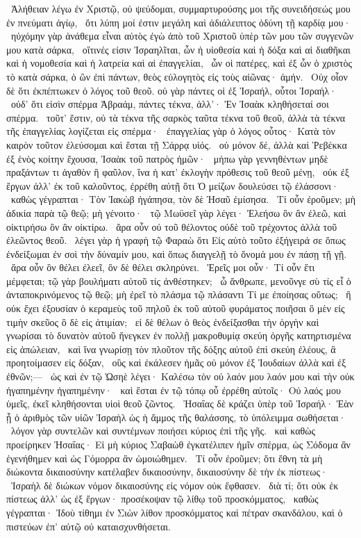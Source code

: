 ~Ἀλήθειαν λέγω ἐν Χριστῷ, οὐ ψεύδομαι, συμμαρτυρούσης μοι τῆς συνειδήσεώς μου ἐν πνεύματι ἁγίῳ,
~ὅτι λύπη μοί ἐστιν μεγάλη καὶ ἀδιάλειπτος ὀδύνη τῇ καρδίᾳ μου·
~ηὐχόμην γὰρ ἀνάθεμα εἶναι αὐτὸς ἐγὼ ἀπὸ τοῦ Χριστοῦ ὑπὲρ τῶν  μου τῶν συγγενῶν μου κατὰ σάρκα,
~οἵτινές εἰσιν Ἰσραηλῖται, ὧν ἡ υἱοθεσία καὶ ἡ δόξα καὶ αἱ διαθῆκαι καὶ ἡ νομοθεσία καὶ ἡ λατρεία καὶ αἱ ἐπαγγελίαι,
~ὧν οἱ πατέρες, καὶ ἐξ ὧν ὁ χριστὸς τὸ κατὰ σάρκα, ὁ ὢν ἐπὶ πάντων, θεὸς εὐλογητὸς εἰς τοὺς αἰῶνας· ἀμήν.
~Οὐχ οἷον δὲ ὅτι ἐκπέπτωκεν ὁ λόγος τοῦ θεοῦ. οὐ γὰρ πάντες οἱ ἐξ Ἰσραήλ, οὗτοι Ἰσραήλ·
~οὐδ’ ὅτι εἰσὶν σπέρμα Ἀβραάμ, πάντες τέκνα, ἀλλ’· Ἐν Ἰσαὰκ κληθήσεταί σοι σπέρμα.
~τοῦτ’ ἔστιν, οὐ τὰ τέκνα τῆς σαρκὸς ταῦτα τέκνα τοῦ θεοῦ, ἀλλὰ τὰ τέκνα τῆς ἐπαγγελίας λογίζεται εἰς σπέρμα·
~ἐπαγγελίας γὰρ ὁ λόγος οὗτος· Κατὰ τὸν καιρὸν τοῦτον ἐλεύσομαι καὶ ἔσται τῇ Σάρρᾳ υἱός.
~οὐ μόνον δέ, ἀλλὰ καὶ Ῥεβέκκα ἐξ ἑνὸς κοίτην ἔχουσα, Ἰσαὰκ τοῦ πατρὸς ἡμῶν·
~μήπω γὰρ γεννηθέντων μηδὲ πραξάντων τι ἀγαθὸν ἢ φαῦλον, ἵνα ἡ κατ’ ἐκλογὴν πρόθεσις τοῦ θεοῦ μένῃ,
~οὐκ ἐξ ἔργων ἀλλ’ ἐκ τοῦ καλοῦντος, ἐρρέθη αὐτῇ ὅτι Ὁ μείζων δουλεύσει τῷ ἐλάσσονι·
~καθὼς γέγραπται· Τὸν Ἰακὼβ ἠγάπησα, τὸν δὲ Ἠσαῦ ἐμίσησα.
~Τί οὖν ἐροῦμεν; μὴ ἀδικία παρὰ τῷ θεῷ; μὴ γένοιτο·
~τῷ Μωϋσεῖ γὰρ λέγει· Ἐλεήσω ὃν ἂν ἐλεῶ, καὶ οἰκτιρήσω ὃν ἂν οἰκτίρω.
~ἄρα οὖν οὐ τοῦ θέλοντος οὐδὲ τοῦ τρέχοντος ἀλλὰ τοῦ ἐλεῶντος θεοῦ.
~λέγει γὰρ ἡ γραφὴ τῷ Φαραὼ ὅτι Εἰς αὐτὸ τοῦτο ἐξήγειρά σε ὅπως ἐνδείξωμαι ἐν σοὶ τὴν δύναμίν μου, καὶ ὅπως διαγγελῇ τὸ ὄνομά μου ἐν πάσῃ τῇ γῇ.
~ἄρα οὖν ὃν θέλει ἐλεεῖ, ὃν δὲ θέλει σκληρύνει.
~Ἐρεῖς μοι οὖν· Τί οὖν ἔτι μέμφεται; τῷ γὰρ βουλήματι αὐτοῦ τίς ἀνθέστηκεν;
~ὦ ἄνθρωπε, μενοῦνγε σὺ τίς εἶ ὁ ἀνταποκρινόμενος τῷ θεῷ; μὴ ἐρεῖ τὸ πλάσμα τῷ πλάσαντι Τί με ἐποίησας οὕτως;
~ἢ οὐκ ἔχει ἐξουσίαν ὁ κεραμεὺς τοῦ πηλοῦ ἐκ τοῦ αὐτοῦ φυράματος ποιῆσαι ὃ μὲν εἰς τιμὴν σκεῦος ὃ δὲ εἰς ἀτιμίαν;
~εἰ δὲ θέλων ὁ θεὸς ἐνδείξασθαι τὴν ὀργὴν καὶ γνωρίσαι τὸ δυνατὸν αὐτοῦ ἤνεγκεν ἐν πολλῇ μακροθυμίᾳ σκεύη ὀργῆς κατηρτισμένα εἰς ἀπώλειαν,
~καὶ ἵνα γνωρίσῃ τὸν πλοῦτον τῆς δόξης αὐτοῦ ἐπὶ σκεύη ἐλέους, ἃ προητοίμασεν εἰς δόξαν,
~οὓς καὶ ἐκάλεσεν ἡμᾶς οὐ μόνον ἐξ Ἰουδαίων ἀλλὰ καὶ ἐξ ἐθνῶν;—
~ὡς καὶ ἐν τῷ Ὡσηὲ λέγει· Καλέσω τὸν οὐ λαόν μου λαόν μου καὶ τὴν οὐκ ἠγαπημένην ἠγαπημένην·
~καὶ ἔσται ἐν τῷ τόπῳ οὗ ἐρρέθη αὐτοῖς· Οὐ λαός μου ὑμεῖς, ἐκεῖ κληθήσονται υἱοὶ θεοῦ ζῶντος.
~Ἠσαΐας δὲ κράζει ὑπὲρ τοῦ Ἰσραήλ· Ἐὰν ᾖ ὁ ἀριθμὸς τῶν υἱῶν Ἰσραὴλ ὡς ἡ ἄμμος τῆς θαλάσσης, τὸ ὑπόλειμμα σωθήσεται·
~λόγον γὰρ συντελῶν καὶ συντέμνων ποιήσει κύριος ἐπὶ τῆς γῆς.
~καὶ καθὼς προείρηκεν Ἠσαΐας· Εἰ μὴ κύριος Σαβαὼθ ἐγκατέλιπεν ἡμῖν σπέρμα, ὡς Σόδομα ἂν ἐγενήθημεν καὶ ὡς Γόμορρα ἂν ὡμοιώθημεν.
~Τί οὖν ἐροῦμεν; ὅτι ἔθνη τὰ μὴ διώκοντα δικαιοσύνην κατέλαβεν δικαιοσύνην, δικαιοσύνην δὲ τὴν ἐκ πίστεως·
~Ἰσραὴλ δὲ διώκων νόμον δικαιοσύνης εἰς νόμον οὐκ ἔφθασεν.
~διὰ τί; ὅτι οὐκ ἐκ πίστεως ἀλλ’ ὡς ἐξ ἔργων· προσέκοψαν τῷ λίθῳ τοῦ προσκόμματος,
~καθὼς γέγραπται· Ἰδοὺ τίθημι ἐν Σιὼν λίθον προσκόμματος καὶ πέτραν σκανδάλου, καὶ ὁ πιστεύων ἐπ’ αὐτῷ οὐ καταισχυνθήσεται.

